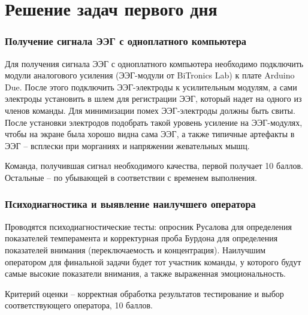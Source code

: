 \section{Решение задач первого дня}

\subsubsection*{Получение сигнала ЭЭГ с одноплатного компьютера}

Для получения сигнала ЭЭГ с одноплатного компьютера необходимо подключить модули аналогового усиления (ЭЭГ-модули от BiTronics Lab) к плате Arduino Due. После этого подключить ЭЭГ-электроды к усилительным модулям, а сами электроды установить в шлем для регистрации ЭЭГ, который надет на одного из членов команды. Для минимизации помех ЭЭГ-электроды должны быть свиты. После установки электродов подобрать такой уровень усиление на ЭЭГ-модулях, чтобы на экране была хорошо видна сама ЭЭГ, а также типичные артефакты в ЭЭГ – всплески при морганиях и напряжении жевательных мышц.

Команда, получившая сигнал необходимого качества, первой получает 10 баллов. Остальные – по убывающей в соответствии с временем выполнения.

\subsubsection*{Психодиагностика и выявление наилучшего оператора}

Проводятся психодиагностические тесты: опросник Русалова для определения показателей темперамента и корректурная проба Бурдона для определения показателей внимания (переключаемость и концентрация). Наилучшим оператором для финальной задачи будет тот участник команды, у которого будут самые высокие показатели внимания, а также выраженная эмоциональность.

Критерий оценки – корректная обработка результатов тестирование и выбор соответствующего оператора, 10 баллов.
